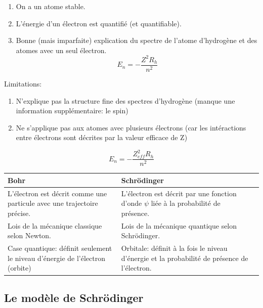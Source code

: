 \documentclass[10pt,a4paper]{book}
\begin{document}
\begin{enumerate}
\item On a un atome stable.
\item L'énergie d'un électron est quantifié (et quantifiable).
\item Bonne (mais imparfaite) explication du spectre de l’atome d’hydrogène et des atomes avec un seul électron.
\begin{displaymath}
E_n = -\frac{{Z^2}{R_h}}{n^2}
\end{displaymath}
\end{enumerate}
Limitations:
\begin{enumerate}
\item N'explique pas la structure fine des spectres d'hydrogène (manque une information supplémentaire: le spin)
\item Ne s'applique pas aux atomes avec plusieurs électrons (car les intéractions entre électrons sont décrites par la valeur efficace de Z)
\end{enumerate}
\begin{displaymath}
E_n = -\frac{{Z_{eff}^2}{R_h}}{n^2}
\end{displaymath}
\begin{center}
\begin{tabular}{ | m{5cm} | m{5cm}| m{5cm} | } 
  \hline
  Bohr & Schrödinger \\ 
  \hline
  L’électron est décrit comme une particule avec une trajectoire précise. & L'électron est décrit par une fonction d’onde $\psi$ liée à la probabilité de présence. \\ 
  \hline
  Lois de la mécanique classique selon Newton. & Lois de la mécanique quantique selon Schrödinger. \\ 
  \hline
  Case quantique: définit seulement le niveau d’énergie de l’électron (orbite) & Orbitale: définit à la fois le niveau d’énergie et la probabilité de présence de l'électron. \\
  \hline
\end{tabular}
\end{center}

\subsection{Le modèle de Schrödinger}
\end{document}

